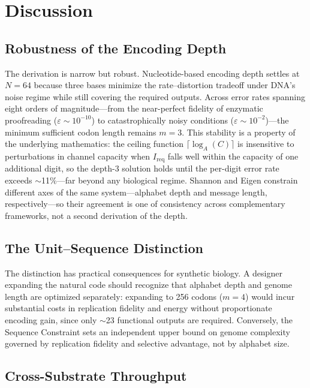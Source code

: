 \documentclass[11pt]{article}
\begin{document}
\section{Discussion}

\subsection{Robustness of the Encoding Depth}

The derivation is narrow but robust. Nucleotide-based encoding depth settles at $N = 64$ because three bases minimize the rate--distortion tradeoff under DNA's noise regime while still covering the required outputs. Across error rates spanning eight orders of magnitude---from the near-perfect fidelity of enzymatic proofreading ($\varepsilon \sim 10^{-10}$) to catastrophically noisy conditions ($\varepsilon \sim 10^{-2}$)---the minimum sufficient codon length remains $m = 3$. This stability is a property of the underlying mathematics: the ceiling function $\lceil \log_A(C) \rceil$ is insensitive to perturbations in channel capacity when $I_{\mathrm{req}}$ falls well within the capacity of one additional digit, so the depth-3 solution holds until the per-digit error rate exceeds $\sim$11\%---far beyond any biological regime. Shannon and Eigen constrain different axes of the same system---alphabet depth and message length, respectively---so their agreement is one of consistency across complementary frameworks, not a second derivation of the depth.

\subsection{The Unit--Sequence Distinction}

The distinction has practical consequences for synthetic biology. A designer expanding the natural code should recognize that alphabet depth and genome length are optimized separately: expanding to 256 codons ($m = 4$) would incur substantial costs in replication fidelity and energy without proportionate encoding gain, since only $\sim$23 functional outputs are required. Conversely, the Sequence Constraint sets an independent upper bound on genome complexity governed by replication fidelity and selective advantage, not by alphabet size.

\subsection{Cross-Substrate Throughput}
\end{document}

